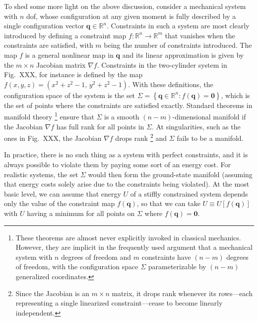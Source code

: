 To shed some more light on the above discussion, consider a mechanical system with $n$ \ac{dof}, whose configuration at any given moment is fully described by a single configuration vector $\bm{q} \in \mathbb{R}^{n}$.
Constraints in such a system are most clearly introduced by defining a constraint map $f: \mathbb{R}^{n} \to \mathbb{R}^{m}$
that vanishes when the constraints are satisfied, with $m$ being the number of constraints introduced.
The map $f$ is a general nonlinear map in $\bm{q}$ and its linear approximation is given by the $m\times n$ Jacobian matrix $\nabla f$.
Constraints in the two-cylinder system in Fig.~XXX, for instance is defined by the map $f(x, y, z) = (x^{2} + z^{2} - 1,\, y^{2} + z^{2} - 1)$.
With these definitions, the configuration space of the system is the set $\Sigma = \left\{\bm{q} \in \mathbb{R}^{n} : f(\bm{q}) = \bm{0}\right\}$, which is the set of points where the constraints are satisfied exactly.
Standard theorems in manifold theory%
\footnote{These theorems are almost never explicitly invoked in classical mechanics.
However, they are implicit in the frequently used argument that a mechanical system with $n$ degrees of freedom and $m$ constraints have $(n-m)$ degrees of freedom, with the configuration space $\Sigma$ parameterizable by $(n-m)$ generalized coordinates.}
ensure that $\Sigma$ is a smooth $(n-m)$-dimensional manifold if the Jacobian $\nabla f$ has full rank for all points in $\Sigma$.
At singularities, such as the ones in Fig.~XXX, the Jacobian $\nabla f$ drops rank%
\footnote{Since the Jacobian is an $m\times n$ matrix, it drops rank whenever its rows---each representing a single linearized constraint---cease to become linearly independent.}
and $\Sigma$ fails to be a manifold.

In practice, there is no such thing as a system with perfect constraints, and it is always possible to violate them by paying some sort of an energy cost.
For realistic systems, the set $\Sigma$ would then form the ground-state manifold (assuming that energy costs solely arise due to the constraints being violated).
At the most basic level, we can assume that energy $U$ of a stiffly constrained system depends only the value of the constraint map $f(\bm{q})$, so that we can take $U \equiv U[f(\bm{q})]$ with $U$ having a minimum for all points on $\Sigma$ where $f(\bm{q}) = \bm{0}$.

